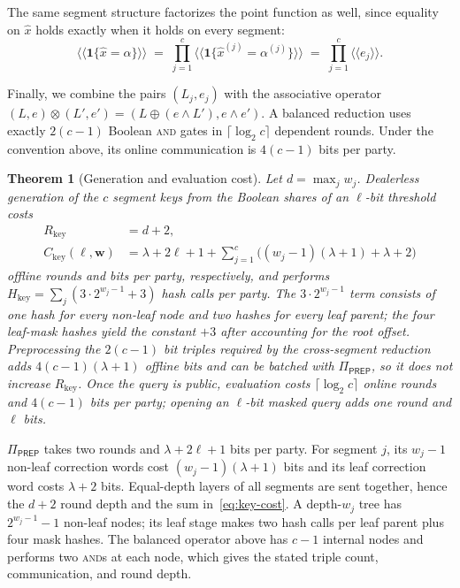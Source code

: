 \documentclass[journal]{IEEEtran}
\newtheorem{theorem}{Theorem}
\theoremstyle{definition}
\theoremstyle{plain}
\newcommand{\rshare}[1]{\langle\!\langle #1 \rangle\!\rangle} %
\newcommand{\ind}[1]{\mathbf{1}\{#1\}}
\newcommand{\xhat}{\hat{x}}
\newcommand{\PREP}{\Pi_{\mathsf{PREP}}}
\newcommand{\seg}[1]{^{\scriptscriptstyle(#1)}}   %
\newcommand{\nseg}{c}                              %
\newcommand{\wseg}{w}                              %
\begin{document}
The same segment structure factorizes the point function as well, since equality on $\xhat$ holds exactly when it holds on every segment:
\begin{equation}
\rshare{\ind{\xhat=\alpha}}\;=\;\prod_{j=1}^{\nseg}\rshare{\ind{\xhat\seg{j}=\alpha\seg{j}}}
\;=\;\prod_{j=1}^{\nseg}\rshare{e_j}.
\label{eq:dpf-decomp}
\end{equation}

Finally, we combine the pairs $(L_j,e_j)$ with the associative operator
$(L,e)\otimes(L',e')=(L\oplus(e\wedge L'),e\wedge e')$. A balanced reduction
uses exactly $2(\nseg-1)$ Boolean \textsc{and} gates in
$\lceil\log_2\nseg\rceil$ dependent rounds. Under the convention above, its
online communication is $4(\nseg-1)$ bits per party.


\begin{theorem}[Generation and evaluation cost]\label{thm:cost}
Let $d=\max_j\wseg_j$. Dealerless generation of the $\nseg$ segment keys from
the Boolean shares of an $\ell$-bit threshold costs
\begin{equation}
\begin{aligned}
R_{\mathrm{key}}&=d+2,\\
C_{\mathrm{key}}(\ell,\boldsymbol{\wseg})
&=\lambda+2\ell+1+
\sum_{j=1}^{\nseg}\big((\wseg_j-1)(\lambda+1)+\lambda+2\big)
\end{aligned}
\label{eq:key-cost}
\end{equation}
offline rounds and bits per party, respectively, and performs
$H_{\mathrm{key}}=\sum_j(3\cdot2^{\wseg_j-1}+3)$ hash calls per party. The
$3\cdot2^{\wseg_j-1}$ term consists of one hash for every non-leaf node and
two hashes for every leaf parent; the four leaf-mask hashes yield the constant
$+3$ after accounting for the root offset. Preprocessing the
$2(\nseg-1)$ bit triples required by the cross-segment reduction adds
$4(\nseg-1)(\lambda+1)$ offline bits and can be batched with $\PREP$, so it
does not increase $R_{\mathrm{key}}$. Once the query is public, evaluation
costs $\lceil\log_2\nseg\rceil$ online rounds and $4(\nseg-1)$ bits per party;
opening an $\ell$-bit masked query adds one round and $\ell$ bits.
\end{theorem}
\begin{IEEEproof}
$\PREP$ takes two rounds and $\lambda+2\ell+1$ bits per party. For segment
$j$, its $\wseg_j-1$ non-leaf correction words cost
$(\wseg_j-1)(\lambda+1)$ bits and its leaf correction word costs
$\lambda+2$ bits. Equal-depth layers of all segments are sent together, hence
the $d+2$ round depth and the sum in~\eqref{eq:key-cost}. A depth-$\wseg_j$
tree has $2^{\wseg_j-1}-1$ non-leaf nodes; its leaf stage makes two hash calls
per leaf parent plus four mask hashes. The balanced operator above has
$\nseg-1$ internal nodes and performs two \textsc{and}s at each node, which
gives the stated triple count, communication, and round depth.
\end{IEEEproof}
\end{document}

